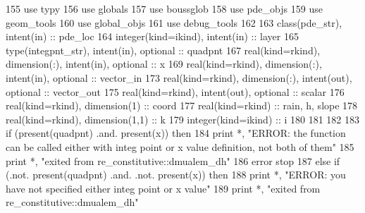 \begin{DoxyCode}
155         \textcolor{keywordtype}{use }typy
156         \textcolor{keywordtype}{use }globals
157         \textcolor{keywordtype}{use }boussglob
158         \textcolor{keywordtype}{use }pde_objs
159         \textcolor{keywordtype}{use }geom_tools
160         \textcolor{keywordtype}{use }global_objs
161         \textcolor{keywordtype}{use }debug_tools
162 
163         \textcolor{keywordtype}{class}(pde_str), \textcolor{keywordtype}{intent(in)} :: pde\_loc
164         \textcolor{keywordtype}{integer(kind=ikind)}, \textcolor{keywordtype}{intent(in)} :: layer
165         \textcolor{keywordtype}{type}(integpnt_str), \textcolor{keywordtype}{intent(in)}, \textcolor{keywordtype}{optional} :: quadpnt    
167         \textcolor{keywordtype}{real(kind=rkind)}, \textcolor{keywordtype}{dimension(:)}, \textcolor{keywordtype}{intent(in)}, \textcolor{keywordtype}{optional} :: x
169         \textcolor{keywordtype}{real(kind=rkind)}, \textcolor{keywordtype}{dimension(:)}, \textcolor{keywordtype}{intent(in)}, \textcolor{keywordtype}{optional} :: vector\_in
173         \textcolor{keywordtype}{real(kind=rkind)}, \textcolor{keywordtype}{dimension(:)}, \textcolor{keywordtype}{intent(out)}, \textcolor{keywordtype}{optional} :: vector\_out
175         \textcolor{keywordtype}{real(kind=rkind)}, \textcolor{keywordtype}{intent(out)}, \textcolor{keywordtype}{optional} :: scalar
176         \textcolor{keywordtype}{real(kind=rkind)}, \textcolor{keywordtype}{dimension(1)} :: coord
177         \textcolor{keywordtype}{real(kind=rkind)} :: rain, h, slope
178         \textcolor{keywordtype}{real(kind=rkind)}, \textcolor{keywordtype}{dimension(1,1)} :: k
179         \textcolor{keywordtype}{integer(kind=ikind)} :: i
180 
181 
182         
183         \textcolor{keywordflow}{if} (\textcolor{keyword}{present}(quadpnt) .and. \textcolor{keyword}{present}(x)) \textcolor{keywordflow}{then}
184           print *, \textcolor{stringliteral}{"ERROR: the function can be called either with integ point or x value definition, not
       both of them"}
185           print *, \textcolor{stringliteral}{"exited from re\_constitutive::dmualem\_dh"}
186           error stop
187         \textcolor{keywordflow}{else} \textcolor{keywordflow}{if} (.not. \textcolor{keyword}{present}(quadpnt) .and. .not. \textcolor{keyword}{present}(x)) \textcolor{keywordflow}{then}
188           print *, \textcolor{stringliteral}{"ERROR: you have not specified either integ point or x value"}
189           print *, \textcolor{stringliteral}{"exited from re\_constitutive::dmualem\_dh"}

\end{DoxyCode}
